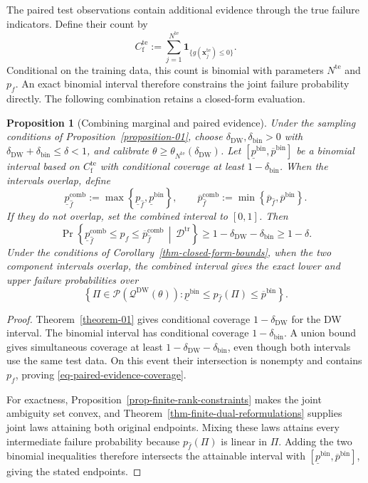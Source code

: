 \documentclass[review,11pt,3p,authoryear,nopreprintline]{elsarticle}
\newtheorem{proposition}{Proposition}
\begin{document}
The paired test observations contain additional evidence through the true failure indicators. Define their count by
\[
  C_{\mathrm f}^{\mathrm{te}}
    :=\sum_{j=1}^{N^{\mathrm{te}}}\mathbf1_{\{g(\bm x_j^{\mathrm{te}})\le0\}}.
\]
Conditional on the training data, this count is binomial with parameters $N^{\mathrm{te}}$ and $p_f$. An exact binomial interval \citep{C.P34} therefore constrains the joint failure probability directly. The following combination retains a closed-form evaluation.

\begin{proposition}[Combining marginal and paired evidence]
  \label{prop-paired-evidence}
  Under the sampling conditions of Proposition~\ref{proposition-01}, choose $\delta_{\mathrm{DW}},\delta_{\mathrm{bin}}>0$ with $\delta_{\mathrm{DW}}+\delta_{\mathrm{bin}}\le\delta<1$, and calibrate $\theta\ge\theta_{N^{\mathrm{te}}}(\delta_{\mathrm{DW}})$. Let $[\underline p^{\mathrm{bin}},\overline p^{\mathrm{bin}}]$ be a binomial interval based on $C_{\mathrm f}^{\mathrm{te}}$ with conditional coverage at least $1-\delta_{\mathrm{bin}}$. When the intervals overlap, define
  \[
    \underline p_{\hat f}^{\mathrm{comb}}
      :=\max\left\{\underline p_{\hat f},\underline p^{\mathrm{bin}}\right\},
    \qquad
    \overline p_{\hat f}^{\mathrm{comb}}
      :=\min\left\{\overline p_{\hat f},\overline p^{\mathrm{bin}}\right\}.
  \]
  If they do not overlap, set the combined interval to $[0,1]$. Then
  \begin{equation}
    \Pr\left\{\underline p_{\hat f}^{\mathrm{comb}}\le p_f
      \le\overline p_{\hat f}^{\mathrm{comb}}
      \,\middle|\,\mathcal D^{\mathrm{tr}}\right\}
      \ge1-\delta_{\mathrm{DW}}-\delta_{\mathrm{bin}}\ge1-\delta.
    \label{eq-paired-evidence-coverage}
  \end{equation}
  Under the conditions of Corollary~\ref{thm-closed-form-bounds}, when the two component intervals overlap, the combined interval gives the exact lower and upper failure probabilities over
  \[
    \left\{\Pi\in\mathcal P\left(\mathcal Q^{\mathrm{DW}}(\theta)\right):
      \underline p^{\mathrm{bin}}\le p_{\hat f}(\Pi)
      \le\overline p^{\mathrm{bin}}\right\}.
  \]
\end{proposition}
\begin{proof}
  Theorem~\ref{theorem-01} gives conditional coverage $1-\delta_{\mathrm{DW}}$ for the DW interval. The binomial interval has conditional coverage $1-\delta_{\mathrm{bin}}$. A union bound gives simultaneous coverage at least $1-\delta_{\mathrm{DW}}-\delta_{\mathrm{bin}}$, even though both intervals use the same test data. On this event their intersection is nonempty and contains $p_f$, proving \eqref{eq-paired-evidence-coverage}.

  For exactness, Proposition~\ref{prop-finite-rank-constraints} makes the joint ambiguity set convex, and Theorem~\ref{thm-finite-dual-reformulations} supplies joint laws attaining both original endpoints. Mixing these laws attains every intermediate failure probability because $p_{\hat f}(\Pi)$ is linear in $\Pi$. Adding the two binomial inequalities therefore intersects the attainable interval with $[\underline p^{\mathrm{bin}},\overline p^{\mathrm{bin}}]$, giving the stated endpoints.
\end{proof}
\end{document}
